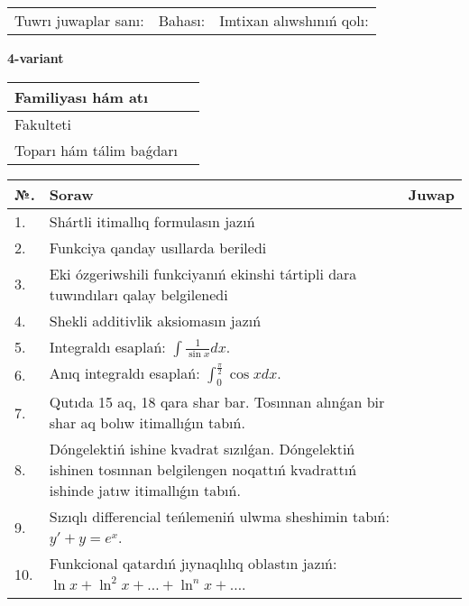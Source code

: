 \documentclass{article}
\begin{document}
\vspace{1cm}

\begin{tabular}{ c c c }
Tuwrı juwaplar sanı: \underline{\hspace{2cm}} & Bahası: \underline{\hspace{2cm}} & Imtixan alıwshınıń qolı: \underline{\hspace{2cm}} \\
\end{tabular}

\newpage

\begin{center}\textbf{4-variant}\end{center}

\bgroup
\def\arraystretch{1.5}
\begin{tabular}{ |m{6cm}|m{10cm}| }
  \hline
  Familiyası hám atı & \\
  \hline
  Fakulteti &\\
  \hline
  Toparı hám tálim baǵdarı & \\
  \hline
\end{tabular}
\egroup

\vspace{0.5cm}

\bgroup
\def\arraystretch{2}
\begin{tabular}{ |l|m{8cm}|m{7cm}| }
  \hline
  №. & Soraw & Juwap \\
  \hline
  1. & Shártli itimallıq formulasın jazıń &  \\
  \hline
  2. & Funkciya qanday usıllarda beriledi &  \\
  \hline
  3. & Eki ózgeriwshili funkciyanıń ekinshi tártipli dara tuwındıları qalay belgilenedi &  \\
  \hline
  4. & Shekli additivlik aksiomasın jazıń &  \\
  \hline
  5. & Integraldı esaplań: $\displaystyle\int {\frac{1}{\sin x}dx} $. &  \\
  \hline
  6. & Anıq integraldı esaplań: $\displaystyle\int_{0}^{\frac{\pi}{2}}\cos xdx$. &  \\
  \hline
  7. & Qutıda 15 aq, 18 qara shar bar. Tosınnan alınǵan bir shar aq bolıw itimallıǵın tabıń. &  \\
  \hline
  8. & Dóngelektiń ishine kvadrat sızılǵan. Dóngelektiń ishinen tosınnan belgilengen noqattıń kvadrattıń ishinde jatıw itimallıǵın tabıń. &  \\
  \hline
  9. & Sızıqlı differencial teńlemeniń ulwma sheshimin tabıń: $y' + y =e^{x}$. &  \\
  \hline
  10. & Funkcional qatardıń jıynaqlılıq oblastın jazıń: $\ln x + \ln^{2}x + \ldots + \ln^{n}x + \ldots$. &  \\
  \hline
\end{tabular}
\egroup
\end{document}
